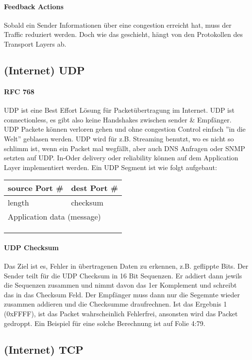 			\paragraph{Feedback Actions}
				Sobald ein Sender Informationen über eine congestion erreicht hat, muss der Traffic reduziert werden. Doch wie das geschieht, hängt von den Protokollen des Transport Layers ab.

	\subsection{(Internet) UDP}
		\paragraph{RFC 768} 
			UDP ist eine Best Effort Lösung für Packetübertragung im Internet. UDP ist connectionless, es gibt also keine Handshakes zwischen sender \& Empfänger. UDP Packete können verloren gehen und ohne congestion Control einfach ''in die Welt'' geblasen werden. UDP wird für z.B. Streaming benutzt, wo es nicht so schlimm ist, wenn ein Packet mal wegfällt, aber auch DNS Anfragen oder SNMP setzten auf UDP. In-Oder delivery oder reliability können auf dem Application Layer implementiert werden. Ein UDP Segment ist wie folgt aufgebaut:
			\begin{table}[h]
				\centering
				\begin{tabular}{|l|l|l|l|l|l|l|l|}
				\hline
				\multicolumn{4}{|l|}{source Port \#} & \multicolumn{4}{l|}{dest Port \#} \\ \hline
				\multicolumn{4}{|l|}{length}         & \multicolumn{4}{l|}{checksum}     \\ \hline
				\multicolumn{8}{|l|}{Application data (message)}        				 \\
				\multicolumn{8}{|l|}{}                                                   \\
				\multicolumn{8}{|l|}{}                                                   \\
				\multicolumn{8}{|l|}{}                                                   \\ \hline
				\end{tabular}
			\end{table}

		\paragraph{UDP Checksum}
			Das Ziel ist es, Fehler in übertragenen Daten zu erkennen, z.B. geflippte Bits. Der Sender teilt für die UDP Checksum in 16 Bit Sequenzen. Er addiert dann jewils die Sequenzen zusammen und nimmt davon das 1er Komplement und schreibt das in das Checksum Feld. Der Empfänger muss dann nur die Segemnte wieder zusammen addieren und die Checksumme draufrechnen. Ist das Ergebnis 1 (0xFFFF), ist das Packet wahrscheinlich Fehlerfrei, ansonsten wird das Packet gedroppt. Ein Beispiel für eine solche Berechnung ist auf Folie 4:79.

	\subsection{(Internet) TCP}
		